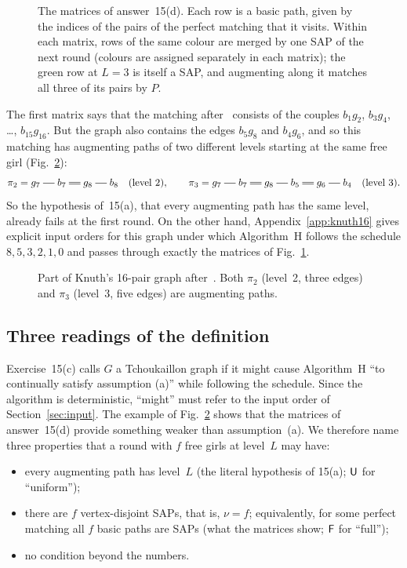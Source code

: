 \begin{figure}[ht]
\centering

\caption{The matrices of answer~15(d). Each row is a basic path, given by
the indices of the pairs of the perfect matching that it visits. Within
each matrix, rows of the same colour are merged by one SAP of the next
round (colours are assigned separately in each matrix); the green row at
$L=3$ is itself a SAP, and augmenting along it matches all three of its
pairs by $P$.}
\label{fig:knuth16rows}
\end{figure}

The first matrix says that the matching after~ consists of the
couples $b_1g_2$, $b_3g_4$, \dots, $b_{15}g_{16}$. But the graph also
contains the edges $b_5g_8$ and $b_4g_6$, and so this matching has
augmenting paths of two different levels starting at the same free girl
(Fig.~\ref{fig:knuth16paths}):
\begin{equation}
  \pi_2=g_7\sg b_7\db g_8\sg b_8\quad(\text{level }2),\qquad
  \pi_3=g_7\sg b_7\db g_8\sg b_5\db g_6\sg b_4\quad(\text{level }3).
  \label{eq:PQ}
\end{equation}
So the hypothesis of~15(a), that every augmenting path has the same
level, already fails at the first round. On the other hand,
Appendix~\ref{app:knuth16} gives explicit input orders for this graph
under which Algorithm~H follows the schedule $8,5,3,2,1,0$ and passes
through exactly the matrices of Fig.~\ref{fig:knuth16rows}.

\begin{figure}[ht]
\centering

\caption{Part of Knuth's 16-pair graph after~. Both $\pi_2$ (level~2,
three edges) and $\pi_3$ (level~3, five edges) are augmenting paths.}
\label{fig:knuth16paths}
\end{figure}

\subsection{Three readings of the definition}
\label{sec:readings}

Exercise~15(c) calls $G$ a Tchoukaillon graph if it might cause
Algorithm~H ``to continually satisfy assumption (a)'' while following the
schedule. Since the algorithm is deterministic, ``might'' must refer to
the input order of Section~\ref{sec:input}. The example of
Fig.~\ref{fig:knuth16paths} shows that the matrices of answer~15(d)
provide something weaker than assumption~(a). We therefore name three
properties that a round with $f$ free girls at level~$L$ may have:
\begin{itemize}
\item[$\Up$:] every augmenting path has level~$L$ (the literal hypothesis
  of 15(a); $\Up$ for ``uniform'');
\item[$\Bp$:] there are $f$ vertex-disjoint SAPs, that is, $\nu=f$;
  equivalently, for some perfect matching all $f$ basic paths are SAPs
  (what the matrices show; $\Bp$ for ``full'');
\item[$\Op$:] no condition beyond the numbers.
\end{itemize}

